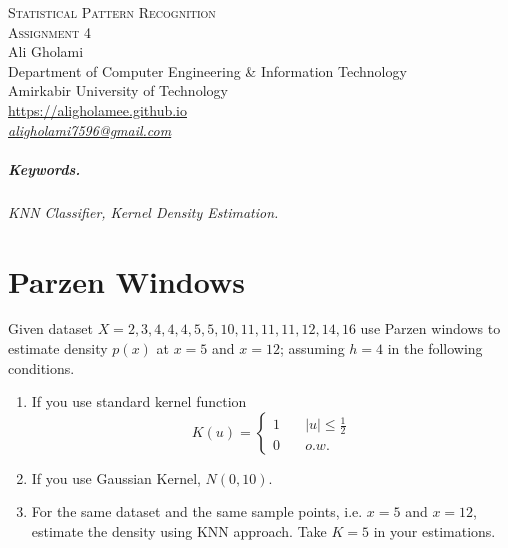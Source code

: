 \documentclass[12pt]{article}
\numberwithin{equation}{section}
\numberwithin{table}{section}
\numberwithin{figure}{section}
\begin{document}

\begin{center}
\textsc{\Large Statistical Pattern Recognition} \\[2pt]
	\textsc{\large Assignment 4}\\
	\vspace{0.5cm}
  Ali Gholami \\[6pt]
  Department of Computer Engineering \& Information Technology\\
  Amirkabir University of Technology  \\[6pt]
  \def\UrlFont{\em}
  \url{https://aligholamee.github.io}\\
    \href{mailto:aligholami7596@gmail.com}{\textit{aligholami7596@gmail.com}}
\end{center}

\begin{abstract}

\end{abstract}

\subparagraph{Keywords.} \textit{KNN Classifier, Kernel Density Estimation.}

\section{Parzen Windows}
Given dataset $ X = 2, 3, 4, 4, 4, 5, 5, 10, 11, 11, 11, 12, 14, 16 $ use Parzen windows to estimate density $p(x)$ at $x = 5$ and $x = 12$; assuming $h = 4$ in the following conditions.
\begin{enumerate}[label=(\alph*)]
	\item If you use standard kernel function
	\[ K(u) =
	\begin{cases}
	1      & \quad |u| \leq \frac{1}{2}\\
	0  & \quad o.w.
	\end{cases}
	\]


	\item If you use Gaussian Kernel, $N(0, 10)$.
	
	\item For the same dataset and the same sample points, i.e. $x = 5$ and $x = 12$, estimate the density using KNN approach. Take $ K = 5$ in your estimations.

\end{enumerate}
\end{document}
